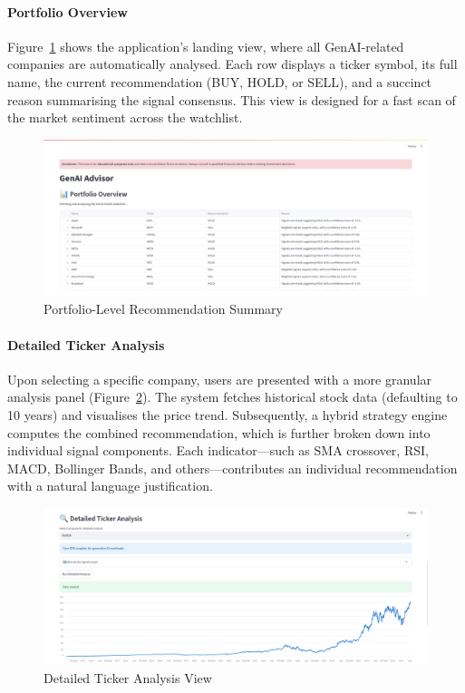 \paragraph{Portfolio Overview}
Figure~\ref{fig:ui_portfolio} shows the application’s landing view, where all GenAI-related companies are automatically analysed. Each row displays a ticker symbol, its full name, the current recommendation (BUY, HOLD, or SELL), and a succinct reason summarising the signal consensus. This view is designed for a fast scan of the market sentiment across the watchlist.

\begin{figure}[h]
\centering
\includegraphics[width=0.9\linewidth]{assets/ui1-portfolio_overview.png}
\caption{Portfolio-Level Recommendation Summary}
\label{fig:ui_portfolio}
\end{figure}

\paragraph{Detailed Ticker Analysis}
Upon selecting a specific company, users are presented with a more granular analysis panel (Figure~\ref{fig:ui_detailed}). The system fetches historical stock data (defaulting to 10 years) and visualises the price trend. Subsequently, a hybrid strategy engine computes the combined recommendation, which is further broken down into individual signal components. Each indicator—such as SMA crossover, RSI, MACD, Bollinger Bands, and others—contributes an individual recommendation with a natural language justification.

\begin{figure}[h]
\centering
\includegraphics[width=0.9\linewidth]{assets/ui2-ticker_analysis.png}
\caption{Detailed Ticker Analysis View}
\label{fig:ui_detailed}
\end{figure}

